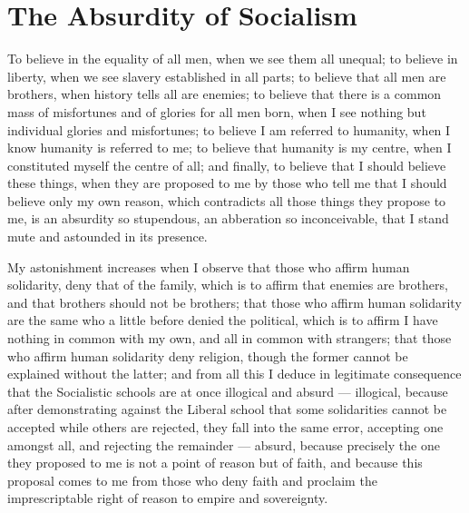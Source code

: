 \section{The Absurdity of Socialism}

\begin{quotationx}
To believe in the equality of all men, when we see them all unequal; to believe in liberty, when we see slavery established in all parts; to believe that all men are brothers, when history tells all are enemies; to believe that there is a common mass of misfortunes and of glories for all men born, when I see nothing but individual glories and misfortunes; to believe I am referred to humanity, when I know humanity is referred to me; to believe that humanity is my centre, when I constituted myself the centre of all; and finally, to believe that I should believe these things, when they are proposed to me by those who tell me that I should believe only my own reason, which contradicts all those things they propose to me, is an absurdity so stupendous, an abberation so inconceivable, that I stand mute and astounded in its presence.

My astonishment increases when I observe that those who affirm human solidarity, deny that of the family, which is to affirm that enemies are brothers, and that brothers should not be brothers; that those who affirm human solidarity are the same who a little before denied the political, which is to affirm I have nothing in common with my own, and all in common with strangers; that those who affirm human solidarity deny religion, though the former cannot be explained without the latter; and from all this I deduce in legitimate consequence that the Socialistic schools are at once illogical and absurd --- illogical, because after demonstrating against the Liberal school that some solidarities cannot be accepted while others are rejected, they fall into the same error, accepting one amongst all, and rejecting the remainder --- absurd, because precisely the one they proposed to me is not a point of reason but of faith, and because this proposal comes to me from those who deny faith and proclaim the imprescriptable right of reason to empire and sovereignty.

\end{quotationx}



